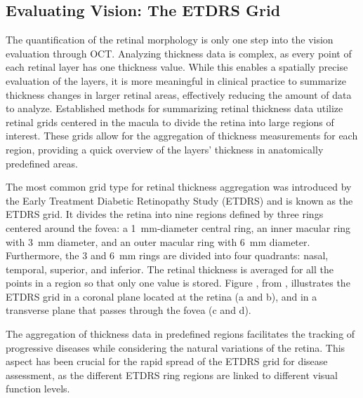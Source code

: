 \subsection{Evaluating Vision: The ETDRS Grid}
The quantification of the retinal morphology is only one step into the vision evaluation through OCT. Analyzing thickness data is complex, as every point of each retinal layer has one thickness value. While this enables a spatially precise evaluation of the layers, it is more meaningful in clinical practice to summarize thickness changes in larger retinal areas, effectively reducing the amount of data to analyze. Established methods for summarizing retinal thickness data utilize retinal grids centered in the macula to divide the retina into large regions of interest. These grids allow for the aggregation of thickness measurements for each region, providing a quick overview of the layers' thickness in anatomically predefined areas. 

The most common grid type for retinal thickness aggregation was introduced by the Early Treatment Diabetic Retinopathy Study (ETDRS) and is known as the ETDRS grid. It divides the retina into nine regions defined by three rings centered around the fovea: a \qty{1}{\milli\metre}-diameter central ring, an inner macular ring with \qty{3}{\milli\metre} diameter, and an outer macular ring with \qty{6}{\milli\metre} diameter. Furthermore, the 3 and \qty{6}{\milli\metre} rings are divided into four quadrants: nasal, temporal, superior, and inferior. The retinal thickness is averaged for all the points in a region so that only one value is stored. Figure , from , illustrates the ETDRS grid in a coronal plane located at the retina (a and b), and in a transverse plane that passes through the fovea (c and d). 


The aggregation of thickness data in predefined regions facilitates the tracking of progressive diseases while considering the natural variations of the retina. This aspect has been crucial for the rapid spread of the ETDRS grid for disease assessment, as the different ETDRS ring regions are linked to different visual function levels. 

